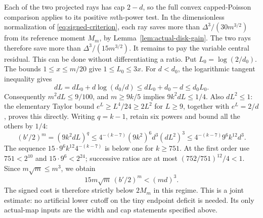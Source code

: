 \documentclass[11pt]{article}
\begin{document}
	Each of the two projected rays has cap $2-d$, so the full convex
	capped-Poisson comparison applies to its positive $m$th-power test.
	In the dimensionless normalization of \eqref{eq:signed-criterion}, each
	ray saves more than $\Delta^3/(30m^{3/2})$ from its reference
	moment $M_m$, by Lemma~\ref{lem:actual-disk-gain}.  The two rays therefore save more than
	$\Delta^3/(15m^{3/2})$.
	It remains to pay the variable central residual.  This can be
	done without differentiating a ratio.  Put $L_0=\log(2/d_0)$.
	The bounds $1\leq x\leq m/20$ give $1\leq L_0\leq3x$.
	For $d<d_0$, the logarithmic tangent inequality gives
	\[
	dL=dL_0+d\log(d_0/d)\leq dL_0+d_0-d\leq d_0L_0.
	\]
	Consequently $m^2dL\leq9/100$, and $m\geq9k/5$ implies
	$9k^2dL\leq1/4$.  Also $dL^2\leq1$: the elementary Taylor
	bound $e^L\geq L^4/24\geq2L^2$ for $L\geq9$, together with
	$e^L=2/d$, proves this directly.
	Writing $q=k-1$, retain six powers and bound all the others by
	$1/4$:
	\[
	(b'/2)^m=(9k^2dL)^q
	\leq4^{-(k-7)}(9k^2)^6d^3(dL^2)^3
	\leq4^{-(k-7)}9^6k^{12}d^3.
	\]
	The sequence $15\cdot9^6 k^{12}4^{-(k-7)}$ is below one for
	$k\geq751$.  At the first order use $751<2^{10}$ and
	$15\cdot9^6<2^{24}$; successive ratios are at most
	$(752/751)^{12}/4<1$.  Since $m\sqrt m\leq m^3$, we obtain
	\begin{equation}\label{eq:tiny-ratio}
		15m\sqrt m\,(b'/2)^m<(md)^3.
	\end{equation}
	The signed cost is therefore strictly below $2M_m$ in this
	regime.  This is a joint estimate: no artificial lower cutoff on
	the tiny endpoint deficit is needed.  Its only actual-map inputs are
	the width and cap statements specified above.
	
\end{document}
